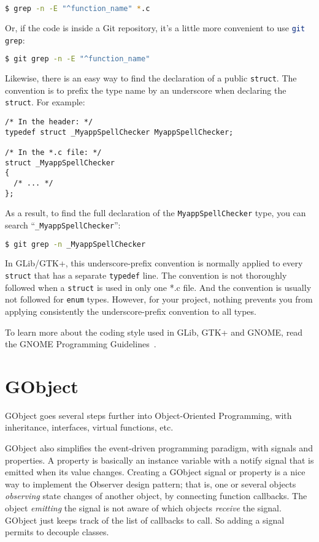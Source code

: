 \begin{lstlisting}[language=bash]
$ grep -n -E "^function_name" *.c
\end{lstlisting}

Or, if the code is inside a Git repository, it's a little more convenient to use \lstinline[language=bash]{git grep}:

\begin{lstlisting}[language=bash]
$ git grep -n -E "^function_name"
\end{lstlisting}

Likewise, there is an easy way to find the declaration of a public \lstinline{struct}. The convention is to prefix the type name by an underscore when declaring the \lstinline{struct}. For example:
\begin{lstlisting}
/* In the header: */
typedef struct _MyappSpellChecker MyappSpellChecker;

/* In the *.c file: */
struct _MyappSpellChecker
{
  /* ... */
};
\end{lstlisting}

As a result, to find the full declaration of the \lstinline{MyappSpellChecker} type, you can search ``\lstinline{_MyappSpellChecker}'':

\begin{lstlisting}[language=bash]
$ git grep -n _MyappSpellChecker
\end{lstlisting}

In GLib/GTK+, this underscore-prefix convention is normally applied to every \lstinline{struct} that has a separate \lstinline{typedef} line. The convention is not thoroughly followed when a \lstinline{struct} is used in only one *.c file. And the convention is usually not followed for \lstinline{enum} types. However, for your project, nothing prevents you from applying consistently the underscore-prefix convention to all types.

To learn more about the coding style used in GLib, GTK+ and GNOME, read the GNOME Programming Guidelines~\cite{gnome-programming-guidelines}.

\chapter{GObject}

GObject goes several steps further into Object-Oriented Programming, with inheritance, interfaces, virtual functions, etc.

GObject also simplifies the event-driven programming paradigm, with signals and properties. A property is basically an instance variable with a notify signal that is emitted when its value changes. Creating a GObject signal or property is a nice way to implement the Observer design pattern; that is, one or several objects \emph{observing} state changes of another object, by connecting function callbacks. The object \emph{emitting} the signal is not aware of which objects \emph{receive} the signal. GObject just keeps track of the list of callbacks to call. So adding a signal permits to decouple classes.

